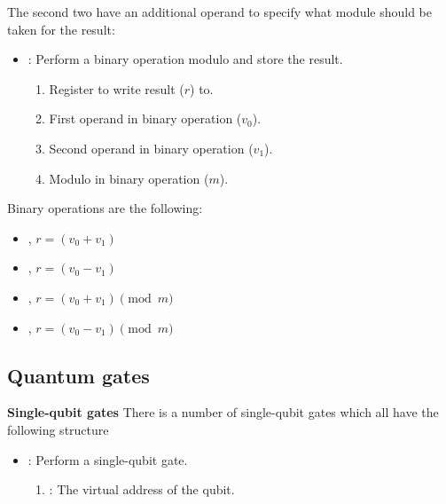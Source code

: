 The second two have an additional operand to specify what module should be taken for the result:
\begin{itemize}
  \item {}: Perform a binary operation modulo  and store the result.
        \begin{enumerate}
          \item \REGISTER Register to write result ($r$) to.
          \item \REGISTER First operand in binary operation ($v_0$).
          \item \REGISTER Second operand in binary operation ($v_1$).
          \item \REGISTER Modulo in binary operation ($m$).
        \end{enumerate}
\end{itemize}

Binary operations are the following:
\begin{itemize}
  \item {}, $r = (v_0 + v_1)$
  \item {}, $r = (v_0 - v_1)$
  \item {}, $r = (v_0 + v_1) \pmod{m} $
  \item {}, $r = (v_0 - v_1) \pmod{m} $
\end{itemize}

\subsection{Quantum gates}
\textbf{Single-qubit gates}
There is a number of single-qubit gates which all have the following structure
\begin{itemize}
  \item {}: Perform a single-qubit gate.
        \begin{enumerate}
          \item \REGISTER: The virtual address of the qubit.
        \end{enumerate}
\end{itemize}

